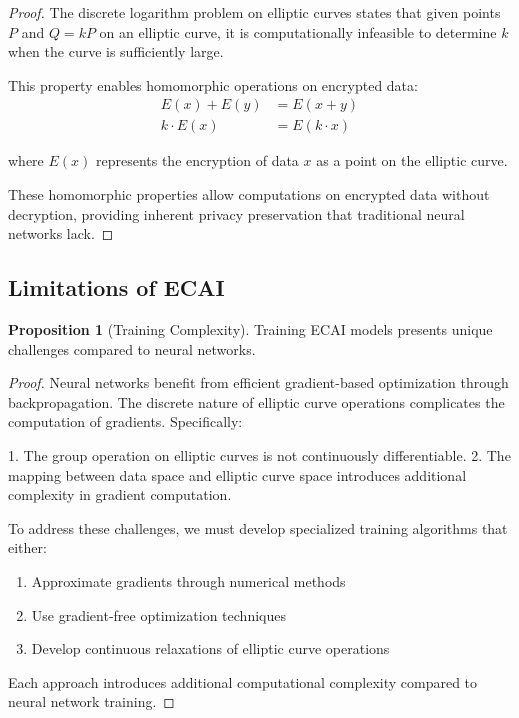 \documentclass[12pt,a4paper]{article}
\theoremstyle{definition}
\newtheorem{proposition}[theorem]{Proposition}
\begin{document}
\begin{proof}
The discrete logarithm problem on elliptic curves states that given points $P$ and $Q = kP$ on an elliptic curve, it is computationally infeasible to determine $k$ when the curve is sufficiently large.

This property enables homomorphic operations on encrypted data:
\begin{align}
E(x) + E(y) &= E(x + y) \\
k \cdot E(x) &= E(k \cdot x)
\end{align}

where $E(x)$ represents the encryption of data $x$ as a point on the elliptic curve.

These homomorphic properties allow computations on encrypted data without decryption, providing inherent privacy preservation that traditional neural networks lack.
\end{proof}

\subsection{Limitations of ECAI}

\begin{proposition}[Training Complexity]
Training ECAI models presents unique challenges compared to neural networks.
\end{proposition}

\begin{proof}
Neural networks benefit from efficient gradient-based optimization through backpropagation. The discrete nature of elliptic curve operations complicates the computation of gradients. Specifically:

1. The group operation on elliptic curves is not continuously differentiable.
2. The mapping between data space and elliptic curve space introduces additional complexity in gradient computation.

To address these challenges, we must develop specialized training algorithms that either:
\begin{enumerate}
\item Approximate gradients through numerical methods
\item Use gradient-free optimization techniques
\item Develop continuous relaxations of elliptic curve operations
\end{enumerate}

Each approach introduces additional computational complexity compared to neural network training.
\end{proof}
\end{document}
